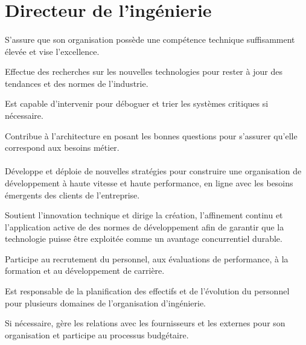 \documentclass[a4paper, french, openany, 12pt]{book}
\newcommand\dex[1]{\textcolor{BrickRed}{\textbf{\bsc{Dex-{#1}}}}}
\newcommand\str[1]{\textcolor{DarkOrchid}{\textbf{\bsc{Str-{#1}}}}}
\newcommand\wis[1]{\textcolor{MidnightBlue}{\textbf{\bsc{Wis-{#1}}}}}
\begin{document}
\chapter{Directeur de l'ingénierie}

\begin{multicols}{2}

  \subsubsection*{\dex{TODO}}

  S'assure que son organisation possède une compétence technique suffisamment élevée et vise l'excellence.

  Effectue des recherches sur les nouvelles technologies pour rester à jour des tendances et des normes de l'industrie.

  Est capable d'intervenir pour déboguer et trier les systèmes critiques si nécessaire.

  Contribue à l'architecture en posant les bonnes questions pour s'assurer qu'elle correspond aux besoins métier.

  \subsubsection*{\str{TODO}}

  Développe et déploie de nouvelles stratégies pour construire une organisation de développement à haute vitesse et haute 
  performance, en ligne avec les besoins émergents des clients de l'entreprise.

  Soutient l'innovation technique et dirige la création, l'affinement continu et l'application active de des normes de 
  développement afin de garantir que la technologie puisse être exploitée comme un avantage concurrentiel durable.

  Participe au recrutement du personnel, aux évaluations de performance, à la formation et au développement de carrière. 

  Est responsable de la planification des effectifs et de l'évolution du personnel pour plusieurs domaines de 
  l'organisation d'ingénierie.

  Si nécessaire, gère les relations avec les fournisseurs et les externes pour son organisation et participe au processus 
  budgétaire.

  \subsubsection*{\wis{TODO}}


\end{multicols}
\end{document}
